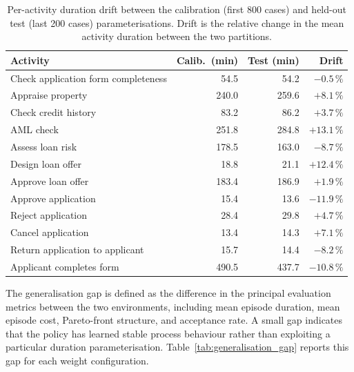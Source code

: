 \begin{table}[H]
\centering
\caption{Per-activity duration drift between the calibration (first 800
cases) and held-out test (last 200 cases) parameterisations. Drift is
the relative change in the mean activity duration between the two
partitions.}
\label{tab:duration_drift}
{\renewcommand{\arraystretch}{1.5}
\setlength{\tabcolsep}{6pt}
\begin{tabular}{lrrr}
\toprule
\textbf{Activity} & \textbf{Calib.\ (min)} & \textbf{Test (min)} &
\textbf{Drift} \\
\midrule
Check application form completeness & 54.5  & 54.2  & $-0.5\,\%$ \\
Appraise property                   & 240.0 & 259.6 & $+8.1\,\%$ \\
Check credit history                & 83.2  & 86.2  & $+3.7\,\%$ \\
AML check                           & 251.8 & 284.8 & $+13.1\,\%$ \\
Assess loan risk                    & 178.5 & 163.0 & $-8.7\,\%$ \\
Design loan offer                   & 18.8  & 21.1  & $+12.4\,\%$ \\
Approve loan offer                  & 183.4 & 186.9 & $+1.9\,\%$ \\
Approve application                 & 15.4  & 13.6  & $-11.9\,\%$ \\
Reject application                  & 28.4  & 29.8  & $+4.7\,\%$ \\
Cancel application                  & 13.4  & 14.3  & $+7.1\,\%$ \\
Return application to applicant     & 15.7  & 14.4  & $-8.2\,\%$ \\
Applicant completes form            & 490.5 & 437.7 & $-10.8\,\%$ \\
\bottomrule
\end{tabular}}
\end{table}

The generalisation gap is defined as the difference in the principal
evaluation metrics between the two environments, including mean
episode duration, mean episode cost, Pareto-front structure, and
acceptance rate. A small gap indicates that the policy has learned
stable process behaviour rather than exploiting a particular duration
parameterisation. Table~\ref{tab:generalisation_gap} reports this gap
for each weight configuration.

